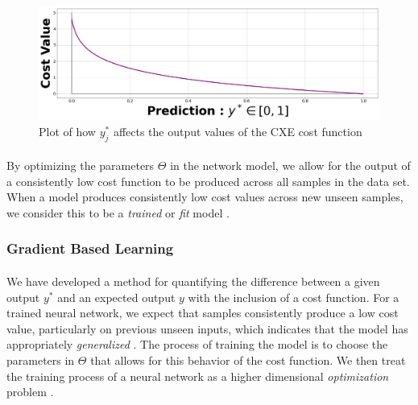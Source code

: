 \documentclass[12pt,letterpaper]{article}
\begin{document}
\begin{figure}[h]
\begin{center}
\includegraphics[scale=0.25]{../Figures/CXELoss}
\end{center}
\caption{Plot of how $y^*_{j}$ affects the output values of the CXE cost function}
\label{fig-CXELoss}
\end{figure}

\paragraph*{}By optimizing the parameters $\Theta$ in the network model, we allow for the output of a consistently low cost function to be produced across all samples in the data set. When a model produces consistently low cost values across new unseen samples, we consider this to be a \textit{trained} or \textit{fit} model \cite{Goodfellow}.


\subsubsection{Gradient Based Learning}

\paragraph*{}We have developed a method for quantifying the difference between a given output $y^*$ and an expected output $y$ with the inclusion of a cost function. For a trained neural network, we expect that samples consistently produce a low cost value, particularly on previous unseen inputs, which indicates that the model has appropriately \textit{generalized} \cite{James,Loy}. The process of training the model is to choose the parameters in $\Theta$ that allows for this behavior of the cost function. We then treat the training process of a neural network as a higher dimensional \textit{optimization} problem \cite{Goodfellow}.
\end{document}
